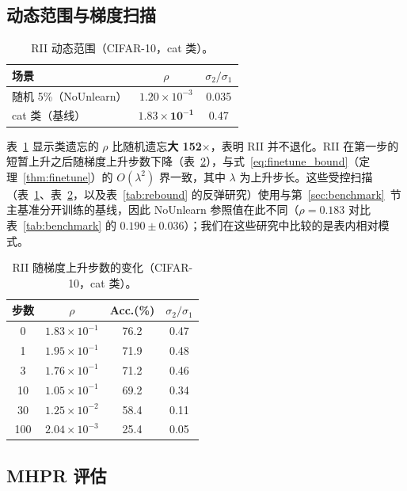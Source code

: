 \subsection{动态范围与梯度扫描}

\begin{table}[t]
\centering
\small
\caption{RII 动态范围（CIFAR-10，cat 类）。}\label{tab:dynamic_range}
\setlength{\tabcolsep}{2pt}
\begin{tabular}{l c c}
\toprule
场景 & $\rho$ & $\sigma_2/\sigma_1$ \\
\midrule
随机 5\%（NoUnlearn） & $1.20\times10^{-3}$ & 0.035 \\
cat 类（基线）   & $\mathbf{1.83\times10^{-1}}$ & 0.47 \\
\bottomrule
\end{tabular}
\end{table}

表~\ref{tab:dynamic_range} 显示类遗忘的 $\rho$ 比随机遗忘\textbf{大 152$\times$}，表明 RII 并不退化。RII 在第一步的短暂上升之后随梯度上升步数下降（表~\ref{tab:gradient_sweep}），与式~\eqref{eq:finetune_bound}（定理~\ref{thm:finetune}）的 $O(\lambda^2)$ 界一致，其中 $\lambda$ 为上升步长。这些受控扫描（表~\ref{tab:dynamic_range}、表~\ref{tab:gradient_sweep}，以及表~\ref{tab:rebound} 的反弹研究）使用与第~\ref{sec:benchmark}~节主基准分开训练的基线，因此 NoUnlearn 参照值在此不同（$\rho{=}0.183$ 对比表~\ref{tab:benchmark} 的 $0.190{\pm}0.036$）；我们在这些研究中比较的是表内相对模式。

\begin{table}[t]
\centering
\small
\caption{RII 随梯度上升步数的变化（CIFAR-10，cat 类）。}\label{tab:gradient_sweep}
\setlength{\tabcolsep}{2pt}
\begin{tabular}{c c c c}
\toprule
步数 & $\rho$ & Acc.(\%) & $\sigma_2/\sigma_1$ \\
\midrule
0 & $1.83\times10^{-1}$ & 76.2 & 0.47 \\
1 & $1.95\times10^{-1}$ & 71.9 & 0.48 \\
3 & $1.76\times10^{-1}$ & 71.2 & 0.46 \\
10 & $1.05\times10^{-1}$ & 69.2 & 0.34 \\
30 & $1.25\times10^{-2}$ & 58.4 & 0.11 \\
100 & $2.04\times10^{-3}$ & 25.4 & 0.05 \\
\bottomrule
\end{tabular}
\end{table}

\subsection{MHPR 评估}

